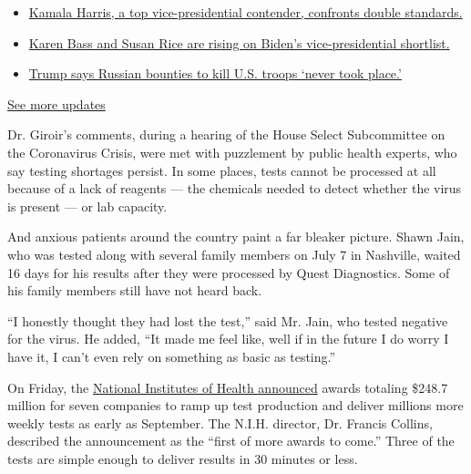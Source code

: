 \begin{itemize}
\tightlist
\item
  \href{https://www.nytimes3xbfgragh.onion/2020/07/31/us/elections/biden-vs-trump.html?action=click\&pgtype=Article\&state=default\&region=MAIN_CONTENT_1\&context=storylines_live_updates\#link-29fdff45}{Kamala
  Harris, a top vice-presidential contender, confronts double
  standards.}
\item
  \href{https://www.nytimes3xbfgragh.onion/2020/07/31/us/elections/biden-vs-trump.html?action=click\&pgtype=Article\&state=default\&region=MAIN_CONTENT_1\&context=storylines_live_updates\#link-13ec3d9c}{Karen
  Bass and Susan Rice are rising on Biden's vice-presidential
  shortlist.}
\item
  \href{https://www.nytimes3xbfgragh.onion/2020/07/31/us/elections/biden-vs-trump.html?action=click\&pgtype=Article\&state=default\&region=MAIN_CONTENT_1\&context=storylines_live_updates\#link-49e9a016}{Trump
  says Russian bounties to kill U.S. troops `never took place.'}
\end{itemize}

\href{https://www.nytimes3xbfgragh.onion/2020/07/31/us/elections/biden-vs-trump.html?action=click\&pgtype=Article\&state=default\&region=MAIN_CONTENT_1\&context=storylines_live_updates}{See
more updates}

Dr. Giroir's comments, during a hearing of the House Select Subcommittee
on the Coronavirus Crisis, were met with puzzlement by public health
experts, who say testing shortages persist. In some places, tests cannot
be processed at all because of a lack of reagents --- the chemicals
needed to detect whether the virus is present --- or lab capacity.

And anxious patients around the country paint a far bleaker picture.
Shawn Jain, who was tested along with several family members on July 7
in Nashville, waited 16 days for his results after they were processed
by Quest Diagnostics. Some of his family members still have not heard
back.

``I honestly thought they had lost the test,'' said Mr. Jain, who tested
negative for the virus. He added, ``It made me feel like, well if in the
future I do worry I have it, I can't even rely on something as basic as
testing.''

On Friday, the
\href{https://www.nih.gov/news-events/news-releases/nih-delivering-new-covid-19-testing-technologies-meet-us-demand}{National
Institutes of Health announced} awards totaling \$248.7 million for
seven companies to ramp up test production and deliver millions more
weekly tests as early as September. The N.I.H. director, Dr. Francis
Collins, described the announcement as the ``first of more awards to
come.'' Three of the tests are simple enough to deliver results in 30
minutes or less.

